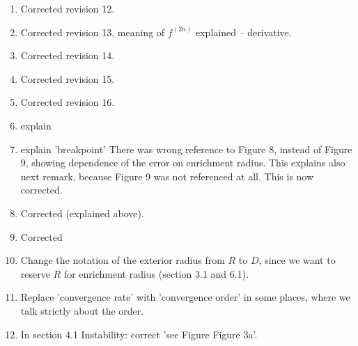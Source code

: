 \documentclass[a4paper,11pt]{article}
\begin{document}
\begin{enumerate}
\item Corrected revision 12. %
\item Corrected revision 13, meaning of $f^{(2n)}$ explained -- derivative. %
\item Corrected revision 14. %
\item Corrected revision 15. %
\item Corrected revision 16. %

\item explain%

\item explain 'breakpoint'
      There was wrong reference to Figure 8, instead of Figure 9, showing dependence of the error on enrichment radius. %
      This explains also next remark, because Figure 9 was not referenced at all.
      This is now corrected. %
\item Corrected (explained above). %
\item Corrected %
\item Change the notation of the exterior radius from $R$ to $D$, since we want to reserve $R$ for enrichment radius (section 3.1 and 6.1).
\item Replace 'convergence rate' with 'convergence order' in some places, where we talk strictly about the order.
\item In section 4.1 Instability: correct 'see Figure Figure 3a'.

\end{enumerate} 
\end{document}

